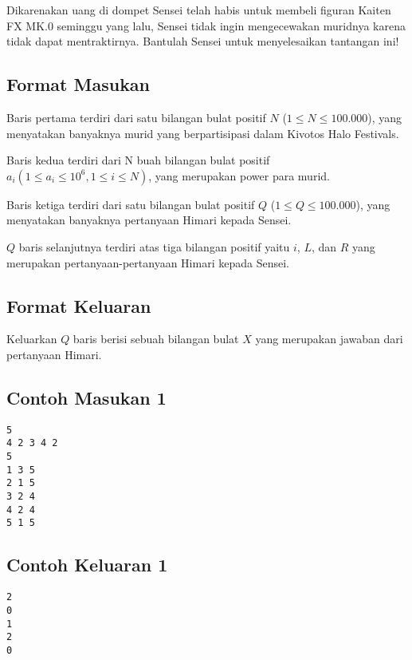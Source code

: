 \documentclass{article}
\begin{document}
Dikarenakan uang di dompet Sensei telah habis untuk membeli figuran Kaiten FX MK.0 seminggu yang lalu, Sensei tidak ingin mengecewakan muridnya karena tidak dapat mentraktirnya. Bantulah Sensei untuk menyelesaikan tantangan ini!

\subsection*{Format Masukan}

Baris pertama terdiri dari satu bilangan bulat positif $N$ ($1 \leq N \leq 100.000$), yang menyatakan banyaknya murid yang berpartisipasi dalam Kivotos Halo Festivals.

Baris kedua terdiri dari N buah bilangan bulat positif $a_i (1 \leq a_i \leq 10^6, 1 \leq i \leq N)$, yang merupakan power para murid.

Baris ketiga terdiri dari satu bilangan bulat positif $Q$ ($1 \leq Q \leq 100.000$), yang menyatakan banyaknya pertanyaan Himari kepada Sensei.

$Q$ baris selanjutnya terdiri atas tiga bilangan positif yaitu $i$, $L$, dan $R$ yang merupakan pertanyaan-pertanyaan Himari kepada Sensei.

\subsection*{Format Keluaran}

Keluarkan $Q$ baris berisi sebuah bilangan bulat $X$ yang merupakan jawaban dari pertanyaan Himari.

\begin{multicols}{2}
\subsection*{Contoh Masukan 1}
\begin{lstlisting}
5
4 2 3 4 2
5
1 3 5
2 1 5
3 2 4
4 2 4
5 1 5
\end{lstlisting}
\columnbreak
\subsection*{Contoh Keluaran 1}
\begin{lstlisting}
2
0
1
2
0
\end{lstlisting}
\vfill
\null
\end{multicols}
\end{document}
